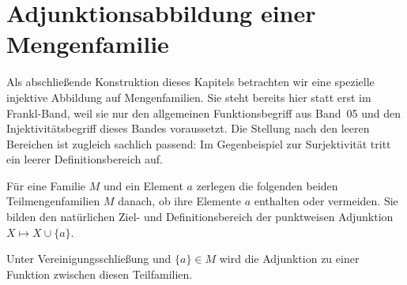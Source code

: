 \documentclass[main.tex]{subfiles}
\begin{document}
\section{Adjunktionsabbildung einer Mengenfamilie}

Als abschließende Konstruktion dieses Kapitels betrachten wir eine spezielle
injektive Abbildung auf Mengenfamilien. Sie steht bereits hier statt erst im
Frankl-Band, weil sie nur den allgemeinen Funktionsbegriff aus Band~05 und den
Injektivitätsbegriff dieses Bandes voraussetzt. Die Stellung nach den leeren
Bereichen ist zugleich sachlich passend: Im Gegenbeispiel zur Surjektivität
tritt ein leerer Definitionsbereich auf.

Für eine Familie \(M\) und ein Element \(a\) zerlegen die folgenden beiden
Teilmengenfamilien \(M\) danach, ob ihre Elemente \(a\) enthalten oder
vermeiden. Sie bilden den natürlichen Ziel- und Definitionsbereich der
punktweisen Adjunktion \(X\mapsto X\cup\{a\}\).



Unter Vereinigungsschließung und \(\{a\}\in M\) wird die Adjunktion zu einer
Funktion zwischen diesen Teilfamilien.

\end{document}
